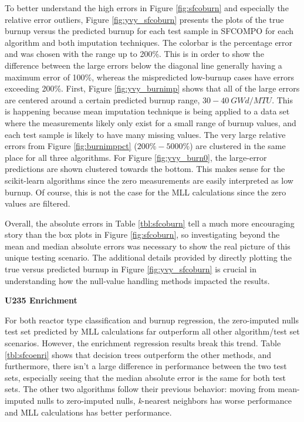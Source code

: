 To better understand the high errors in Figure \ref{fig:sfcoburn} and
especially the relative error outliers, Figure \ref{fig:yvy_sfcoburn} presents
the plots of the true burnup versus the predicted burnup for each test sample
in \gls{SFCOMPO} for each algorithm and both imputation techniques.  The
colorbar is the percentage error and was chosen with the range up to 200\%.
This is in order to show the difference between the large errors below the
diagonal line generally having a maximum error of 100\%, whereas the
mispredicted low-burnup cases have errors exceeding 200\%.  First, Figure
\ref{fig:yvy_burnimp} shows that all of the large errors are centered around a
certain predicted burnup range, $30-40\:GWd/MTU$. This is happening because
mean imputation technique is being applied to a data set where the measurements
likely only exist for a small range of burnup values, and each test sample is
likely to have many missing values.  The very large relative errors from Figure
\ref{fig:burnimppct} ($200\%-5000\%$) are clustered in the same place for all
three algorithms.  For Figure \ref{fig:yvy_burn0}, the large-error predictions
are shown clustered towards the bottom. This makes sense for the scikit-learn
algorithms since the zero measurements are easily interpreted as low burnup. Of
course, this is not the case for the \gls{MLL} calculations since the zero
values are filtered. 

Overall, the absolute errors in Table \ref{tbl:sfcoburn} tell a much more
encouraging story than the box plots in Figure \ref{fig:sfcoburn}, so
investigating beyond the mean and median absolute errors was necessary to show
the real picture of this unique testing scenario. The additional details
provided by directly plotting the true versus predicted burnup in Figure
\ref{fig:yvy_sfcoburn} is crucial in understanding how the null-value handling
methods impacted the results.

\noindent \textbf{\gls{U235} Enrichment}

For both reactor type classification and burnup regression, the zero-imputed
nulls test set predicted by \gls{MLL} calculations far outperform all other
algorithm/test set scenarios. However, the enrichment regression results break
this trend.  Table \ref{tbl:sfcoenri} shows that decision trees outperform the
other methods, and furthermore, there isn't a large difference in performance
between the two test sets, especially seeing that the median absolute error is
the same for both test sets.  The other two algorithms follow their previous
behavior: moving from mean-imputed nulls to zero-imputed nulls,
\textit{k}-nearest neighbors has worse performance and \gls{MLL} calculations
has better performance.

